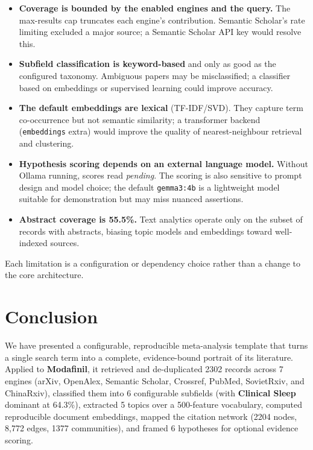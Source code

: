 \documentclass[
  english,
]{article}
\begin{document}
\begin{itemize}
\item
  \textbf{Coverage is bounded by the enabled engines and the query.} The
  max-results cap truncates each engine's contribution. Semantic
  Scholar's rate limiting excluded a major source; a Semantic Scholar
  API key would resolve this.
\item
  \textbf{Subfield classification is keyword-based} and only as good as
  the configured taxonomy. Ambiguous papers may be misclassified; a
  classifier based on embeddings or supervised learning could improve
  accuracy.
\item
  \textbf{The default embeddings are lexical} (TF-IDF/SVD). They capture
  term co-occurrence but not semantic similarity; a transformer backend
  (\texttt{embeddings} extra) would improve the quality of
  nearest-neighbour retrieval and clustering.
\item
  \textbf{Hypothesis scoring depends on an external language model.}
  Without Ollama running, scores read \emph{pending}. The scoring is
  also sensitive to prompt design and model choice; the default
  \texttt{gemma3:4b} is a lightweight model suitable for demonstration
  but may miss nuanced assertions.
\item
  \textbf{Abstract coverage is 55.5\%.} Text analytics operate only on
  the subset of records with abstracts, biasing topic models and
  embeddings toward well-indexed sources.
\end{itemize}

Each limitation is a configuration or dependency choice rather than a
change to the core architecture.

\newpage

\section{Conclusion}\label{conclusion}

We have presented a configurable, reproducible meta-analysis template
that turns a single search term into a complete, evidence-bound portrait
of its literature. Applied to \textbf{Modafinil}, it retrieved and
de-duplicated 2302 records across 7 engines (arXiv, OpenAlex, Semantic
Scholar, Crossref, PubMed, SovietRxiv, and ChinaRxiv), classified them
into 6 configurable subfields (with \textbf{Clinical Sleep} dominant at
64.3\%), extracted 5 topics over a 500-feature vocabulary, computed
reproducible document embeddings, mapped the citation network (2204
nodes, 8,772 edges, 1377 communities), and framed 6 hypotheses for
optional evidence scoring.
\end{document}

